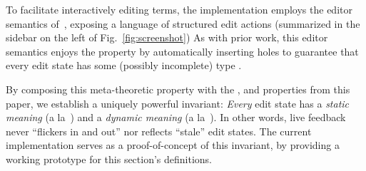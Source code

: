 To facilitate interactively editing terms, the implementation employs
the editor semantics of~\Hazelnut, exposing a language of structured
edit actions (summarized in the sidebar on the left of
Fig.~\ref{fig:screenshot})
%
As with prior work, this editor semantics enjoys
the  property by automatically inserting holes
to guarantee that every edit state has some (possibly incomplete) type
.

By composing this meta-theoretic property with
the , 
and  properties from this paper, we establish a
uniquely powerful invariant: \emph{Every} edit state has a \emph{static
meaning} (a la~\Hazelnut) and a \emph{dynamic meaning} (a la~\HazelnutLive).
%
In other words, live feedback never ``flickers in and out'' nor reflects ``stale'' edit states.
%
The current implementation serves as a proof-of-concept of this invariant, 
by providing a working prototype for this section's definitions.





